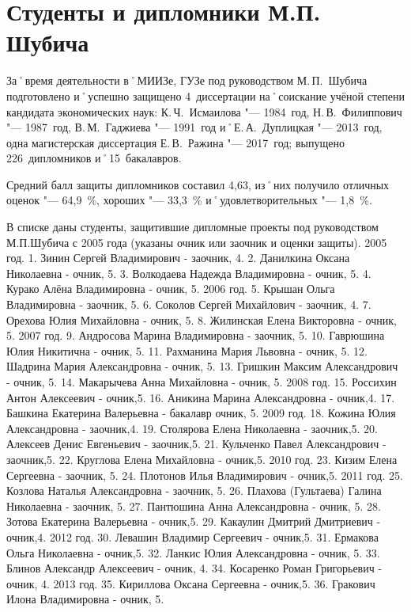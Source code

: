 ﻿\section{Студенты и дипломники М.П. Шубича}
За˚время деятельности в˚МИИЗе, ГУЗе под руководством М.\,П.~Шубича подготовлено и˚успешно защищено 4~диссертации на˚соискание учёной степени кандидата экономических наук: К.\,Ч.~Исмаилова "--- 1984~год, Н.\,В.~Филиппович "--- 1987~год, В.\,М.~Гаджиева "--- 1991~год и˚Е.\,А.~Дуплицкая "--- 2013~год, одна магистерская диссертация Е.\,В.~Ражина "--- 2017~год; выпущено 226~дипломников и˚15~бакалавров.

Средний балл защиты дипломников составил 4,63, из˚них получило отличных оценок "--- 64,9~\%, хороших "--- 33,3~\% и˚удовлетворительных "--- 1,8~\%.

В списке даны студенты, защитившие дипломные проекты под руководством М.П.Шубича с 2005 года (указаны очник или заочник и оценки защиты).
2005 год.
1. Зинин Сергей Владимирович - заочник, 4.
2. Данилкина Оксана Николаевна - очник, 5.
3. Волкодаева Надежда Владимировна - очник, 5.
4. Курако Алёна Владимировна - очник, 5.
2006 год.
5. Крышан Ольга Владимировна - заочник, 5.
6. Соколов Сергей Михайлович - заочник, 4.
7. Орехова Юлия Михайловна - очник, 5.
8. Жилинская Елена Викторовна - очник, 5.
2007 год.
9. Андросова Марина Владимировна - заочник, 5.
10. Гаврюшина Юлия Никитична - очник, 5.
11. Рахманина Мария Львовна - очник, 5.
12. Шадрина Мария Александровна - очник, 5.
13. Гришкин Максим Александрович - очник, 5. 
14. Макарычева Анна Михайловна - очник, 5.
2008 год.
15. Россихин Антон Алексеевич - очник,5.
16. Аникина Марина Александровна - очник,4.
17. Башкина Екатерина Валерьевна - бакалавр очник, 5.
2009 год.
18. Кожина Юлия Александровна - заочник,4.
19. Столярова Елена Николаевна - заочник,5.
20. Алексеев Денис Евгеньевич - заочник,5.
21. Кульченко Павел Александрович - заочник,5.
22. Круглова Елена Михайловна - очник,5.
2010 год.
23. Кизим Елена Сергеевна - заочник, 5.
24. Плотонов Илья Владимирович - очник,5.
2011 год.
25. Козлова Наталья Александровна - заочник, 5.
26. Плахова (Гультаева) Галина Николаевна - заочник, 5.
27. Пантюшина Анна Александровна - очник, 5.
28. Зотова Екатерина Валерьевна - очник,5.
29. Какаулин Дмитрий Дмитриевич - очник,4.
2012 год.
30. Левашин Владимир Сергеевич - очник,5.
31. Ермакова Ольга Николаевна - очник,5.
32. Ланкис Юлия Александровна - очник, 5.
33. Блинов Александр Алексеевич - очник, 4.
34. Косаренко Роман Григорьевич - очник, 4.
2013 год.
35. Кириллова Оксана Сергеевна - очник,5.
36. Гракович Илона Владимировна - очник, 5.
